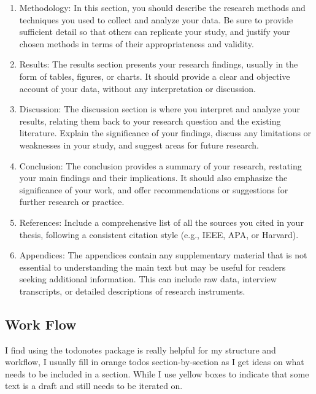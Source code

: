 \begin{enumerate}
    \item Methodology: In this section, you should describe the research methods and techniques you used to collect and analyze your data. Be sure to provide sufficient detail so that others can replicate your study, and justify your chosen methods in terms of their appropriateness and validity.

    \item Results: The results section presents your research findings, usually in the form of tables, figures, or charts. It should provide a clear and objective account of your data, without any interpretation or discussion.

    \item Discussion: The discussion section is where you interpret and analyze your results, relating them back to your research question and the existing literature. Explain the significance of your findings, discuss any limitations or weaknesses in your study, and suggest areas for future research.

    \item Conclusion: The conclusion provides a summary of your research, restating your main findings and their implications. It should also emphasize the significance of your work, and offer recommendations or suggestions for further research or practice.

    \item References: Include a comprehensive list of all the sources you cited in your thesis, following a consistent citation style (e.g., IEEE, APA, or Harvard).

    \item Appendices: The appendices contain any supplementary material that is not essential to understanding the main text but may be useful for readers seeking additional information. This can include raw data, interview transcripts, or detailed descriptions of research instruments.

\end{enumerate}

\subsection{Work Flow}

I find using the todonotes package is really helpful for my structure and workflow, 
I usually fill in orange todos section-by-section as I get ideas on what needs to be included in a section. While I use yellow boxes to indicate that some text is a draft and still needs to be iterated on. 

